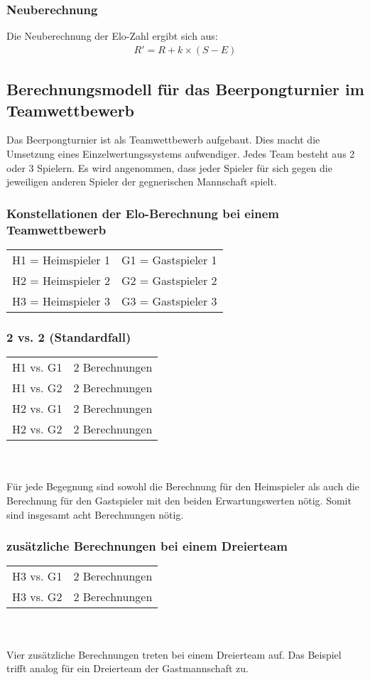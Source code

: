 \documentclass[a5paper, 12pt]{article}
\begin{document}
\subsubsection{Neuberechnung}
Die Neuberechnung der Elo-Zahl ergibt sich aus:
\begin{align}
R' = R + k\times(S-E)
\end{align}

\subsection{Berechnungsmodell für das Beerpongturnier im Teamwettbewerb}
Das Beerpongturnier ist als Teamwettbewerb aufgebaut. Dies macht die Umsetzung eines Einzelwertungssystems aufwendiger. Jedes Team besteht aus 2 oder 3 Spielern.
Es wird angenommen, dass jeder Spieler für sich gegen die jeweiligen anderen Spieler der gegnerischen Mannschaft spielt.
\subsubsection{Konstellationen der Elo-Berechnung bei einem Teamwettbewerb}
\begin{tabular}{lr}
H1 = Heimspieler 1 & G1 = Gastspieler 1 \\
H2 = Heimspieler 2 & G2 = Gastspieler 2 \\
H3 = Heimspieler 3 & G3 = Gastspieler 3 \\
\end{tabular}
\subsubsection{2 vs. 2 (Standardfall)}
\begin{tabular}[h]{ll}
H1 vs. G1 & 2 Berechnungen \\
H1 vs. G2 & 2 Berechnungen \\
H2 vs. G1 & 2 Berechnungen \\
H2 vs. G2 & 2 Berechnungen \\
\end{tabular}
\\
\\Für jede Begegnung sind sowohl die Berechnung für den Heimspieler als auch die Berechnung für den Gastspieler mit den beiden Erwartungswerten nötig. Somit sind insgesamt acht Berechnungen nötig.

\subsubsection{zusätzliche Berechnungen bei einem Dreierteam}
\begin{tabular}[h]{ll}
H3 vs. G1 & 2 Berechnungen \\
H3 vs. G2 & 2 Berechnungen \\
\end{tabular}
\\
\\Vier zusätzliche Berechnungen treten bei einem Dreierteam auf. Das Beispiel trifft analog für ein Dreierteam der Gastmannschaft zu.
\end{document}

